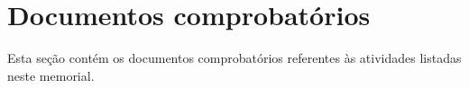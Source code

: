 \documentclass[a4paper,oneside,10pt]{article}
\newcounter{document}%
\begin{document}
\section{Documentos comprobatórios}
Esta seção contém os documentos comprobatórios referentes às atividades listadas neste memorial.
\renewcommand{\thesubsection}{\arabic{subsection}}


\end{document}
